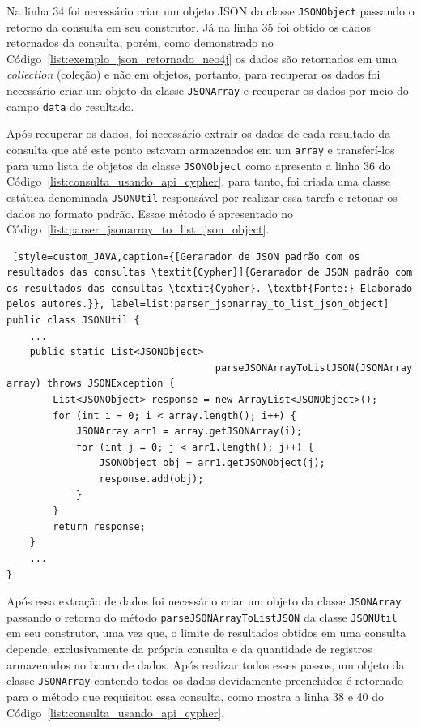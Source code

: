 Na linha 34 foi necessário criar um objeto JSON da classe \texttt{JSONObject} passando o retorno da consulta em seu construtor. Já na linha 35 foi obtido os dados retornados da consulta, porém, como demonstrado no Código~\ref{list:exemplo_json_retornado_neo4j} os dados são retornados em uma \textit{collection} (coleção) e não em objetos, portanto, para recuperar os dados foi necessário criar um objeto da classe \texttt{JSONArray} e recuperar os dados por meio do campo \texttt{data} do resultado.

Após recuperar os dados, foi necessário extrair os dados de cada resultado da consulta que até este ponto estavam armazenados em um \texttt{array} e transferí-los para uma lista de objetos da classe \texttt{JSONObject} como apresenta a linha 36 do Código~\ref{list:consulta_usando_api_cypher}, para tanto, foi criada uma classe estática denominada \texttt{JSONUtil} responsável por realizar essa tarefa e retonar os dados no formato padrão. Essae método é apresentado no Código~\ref{list:parser_jsonarray_to_list_json_object}.

\begin{lstlisting} [style=custom_JAVA,caption={[Gerarador de JSON padrão com os resultados das consultas \textit{Cypher}]{Gerarador de JSON padrão com os resultados das consultas \textit{Cypher}. \textbf{Fonte:} Elaborado pelos autores.}}, label=list:parser_jsonarray_to_list_json_object] 	
public class JSONUtil {
	...
	public static List<JSONObject>
									parseJSONArrayToListJSON(JSONArray array) throws JSONException {
		List<JSONObject> response = new ArrayList<JSONObject>();
		for (int i = 0; i < array.length(); i++) {
			JSONArray arr1 = array.getJSONArray(i);
			for (int j = 0; j < arr1.length(); j++) {
				JSONObject obj = arr1.getJSONObject(j);
				response.add(obj);
			}
		}
		return response;
	}
	...
}
\end{lstlisting}

Após essa extração de dados foi necessário criar um objeto da classe \texttt{JSONArray} passando o retorno do método \texttt{parseJSONArrayToListJSON} da classe \texttt{JSONUtil} em seu construtor, uma vez que, o limite de resultados obtidos em uma consulta depende, exclusivamente da própria consulta e da quantidade de registros armazenados no banco de dados. Após realizar todos esses passos, um objeto da classe \texttt{JSONArray} contendo todos os dados devidamente preenchidos é retornado para o método que requisitou essa consulta, como mostra a linha 38 e 40 do Código~\ref{list:consulta_usando_api_cypher}.
 
